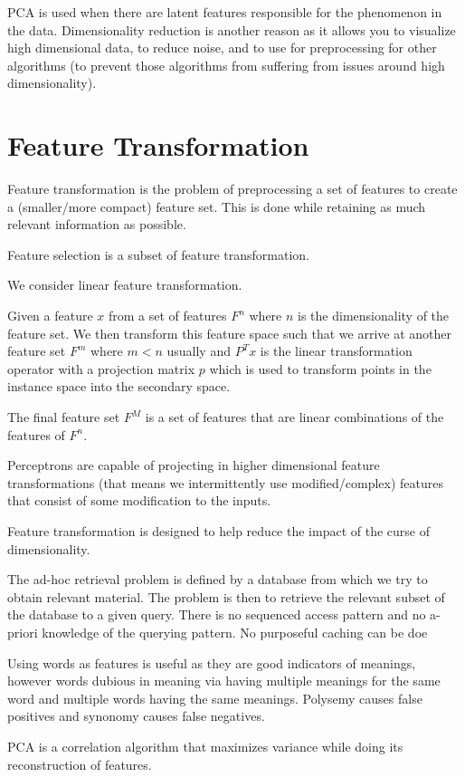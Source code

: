 \documentclass{article}
\begin{document}
PCA is used when there are latent features responsible for the phenomenon in the
data. Dimensionality reduction is another reason as it allows you to visualize
high dimensional data, to reduce noise, and to use for preprocessing for other
algorithms (to prevent those algorithms from suffering from issues around high
dimensionality). 

\section{Feature Transformation}
Feature transformation is the problem of preprocessing a set of features to 
create a  (smaller/more compact) feature set. This is done while retaining as 
much relevant information as possible. 

Feature selection is a subset of feature transformation.

We consider linear feature transformation. 

Given a feature $x$ from a set of features $F^n$ where $n$ is the dimensionality
of the feature set. We then transform this feature space such that we arrive
at another feature set $F^m$ where $m < n$ usually and $P^Tx$ is the linear
transformation operator with a projection matrix $p$ which is used to transform
points in the instance space into the secondary space. 

The final feature set $F^M$ is a set of features that are linear combinations of
the features of $F^n$.

Perceptrons are capable of projecting in higher dimensional feature
transformations (that means we intermittently use modified/complex) features
that consist of some modification to the inputs. 

Feature transformation is designed to help reduce the impact of the curse of
dimensionality. 

The ad-hoc retrieval problem is defined by a database from which we try
to obtain relevant material. The problem is then to retrieve the relevant subset
of the database to a given query. There is no sequenced access pattern and no
a-priori knowledge of the querying pattern. No purposeful caching can be doe 

Using words as features is useful as they are good indicators of meanings, 
however words dubious in meaning via having multiple meanings for the same word
and multiple words having the same meanings. Polysemy causes false positives
and synonomy causes false negatives. 

PCA is a correlation algorithm that maximizes variance while doing its 
reconstruction of features. 
\end{document}
